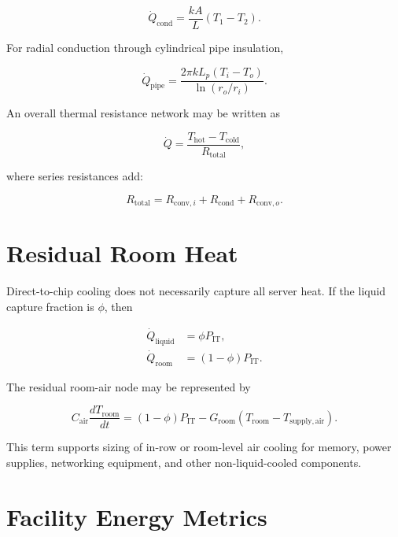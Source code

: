 \documentclass[11pt]{article}
\begin{document}
\begin{equation}
\dot Q_{\mathrm{cond}}
=\frac{kA}{L}(T_1-T_2).
\end{equation}

For radial conduction through cylindrical pipe insulation,

\begin{equation}
\dot Q_{\mathrm{pipe}}
=\frac{2\pi kL_p(T_i-T_o)}
{\ln(r_o/r_i)}.
\end{equation}

An overall thermal resistance network may be written as

\begin{equation}
\dot Q=\frac{T_{\mathrm{hot}}-T_{\mathrm{cold}}}
{R_{\mathrm{total}}},
\end{equation}

where series resistances add:

\begin{equation}
R_{\mathrm{total}}=R_{\mathrm{conv},i}
+R_{\mathrm{cond}}
+R_{\mathrm{conv},o}.
\end{equation}

\section{Residual Room Heat}

Direct-to-chip cooling does not necessarily capture all server heat. If the liquid
capture fraction is \(\phi\), then

\begin{align}
\dot Q_{\mathrm{liquid}}&=\phi P_{\mathrm{IT}},\\
\dot Q_{\mathrm{room}}&=(1-\phi)P_{\mathrm{IT}}.
\end{align}

The residual room-air node may be represented by

\begin{equation}
C_{\mathrm{air}}\frac{dT_{\mathrm{room}}}{dt}
=(1-\phi)P_{\mathrm{IT}}
-G_{\mathrm{room}}(T_{\mathrm{room}}-T_{\mathrm{supply,air}}).
\end{equation}

This term supports sizing of in-row or room-level air cooling for memory, power
supplies, networking equipment, and other non-liquid-cooled components.

\section{Facility Energy Metrics}
\end{document}
